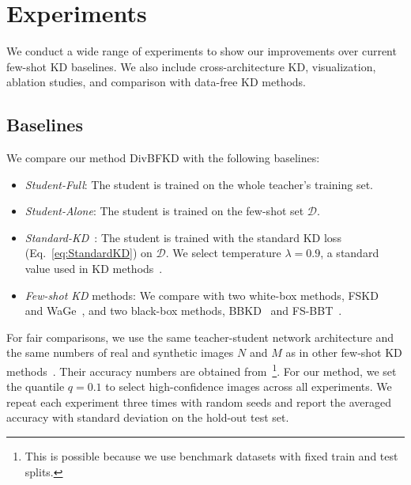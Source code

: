 \section{Experiments} \label{sec:33-research01-experiments}
\begin{foldable}
  We conduct a wide range of experiments to show our improvements over current few-shot \ac{KD} baselines.
  We also include cross-architecture \ac{KD}, visualization, ablation studies, and comparison with data-free \ac{KD} methods.
\end{foldable}

\subsection{Baselines}
\begin{foldable}
  We compare our method DivBFKD with the following baselines:
  \begin{itemize}
    \item \textit{Student-Full}: The student is trained on the whole teacher's training set.
    \item \textit{Student-Alone}: The student is trained on the few-shot set $\mathcal{D}$.
    \item {
        \textit{Standard-KD}~\cite{hinton2015distilling}: The student is trained with the standard \ac{KD} loss (Eq.~\ref{eq:StandardKD}) on $\mathcal{D}$.
        We select temperature $\lambda=0.9$, a standard value used in \ac{KD} methods~\cite{hinton2015distilling,tian2020contrastive,yuan2020revisiting,ma2021undistillable}.
      }
    \item \textit{Few-shot \ac{KD}} methods: We compare with two white-box methods, FSKD~\cite{kimura2018few} and WaGe~\cite{kong2020learning}, and two black-box methods, BBKD~\cite{wang2020neural} and FS-BBT~\cite{nguyen2022black}.
  \end{itemize}
\end{foldable}

\begin{foldable}
  For fair comparisons, we use the same teacher-student network architecture and the same numbers of real and synthetic images $N$ and $M$ as in other few-shot \ac{KD} methods~\cite{kimura2018few,wang2020neural,nguyen2022black}.
  Their accuracy numbers are obtained from~\cite{nguyen2022black}\footnote{This is possible because we use benchmark datasets with fixed train and test splits.}.
  For our method, we set the quantile $q = 0.1$ to select high-confidence images across all experiments.
  We repeat each experiment three times with random seeds and report the averaged accuracy with standard deviation on the hold-out test set.
\end{foldable}

